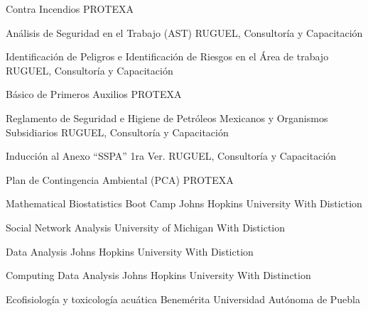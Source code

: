 \documentclass[10pt, letterpaper, roman]{moderncv}
\begin{document}
		{Contra Incendios}
		{\newline PROTEXA}
		{}
		{}
		{}
		
		{Análisis de Seguridad en el Trabajo (AST)}
		{\newline RUGUEL, Consultoría y Capacitación}
		{}
		{}
		{}
		
		{Identificación de Peligros e Identificación de Riesgos en el Área de 
		trabajo}
		{\newline RUGUEL, Consultoría y Capacitación}
		{}
		{}
		{}

		{Básico de Primeros Auxilios}
		{\newline PROTEXA}
		{}
		{}
		{}

		{Reglamento de Seguridad e Higiene de Petróleos Mexicanos y Organismos 
		Subsidiarios}
		{\newline RUGUEL, Consultoría y Capacitación}
		{}
		{}
		{}

		{Inducción al Anexo ``SSPA'' 1ra Ver.}
		{\newline RUGUEL, Consultoría y Capacitación}
		{}
		{}
		{}

		{Plan de Contingencia Ambiental (PCA)}
		{\newline PROTEXA}
		{}
		{}
		{}
		
		{Mathematical Biostatistics Boot Camp}
		{\newline Johns Hopkins University}
		{\newline With Distiction}
		{}
		{}

		{Social Network Analysis}
		{\newline University of Michigan}
		{\newline With Distiction}
		{}
		{}

		{Data Analysis}
		{\newline Johns Hopkins University}
		{\newline With Distiction}
		{}
		{}

		{Computing Data Analysis}
		{\newline Johns Hopkins University}
		{\newline With Distinction}
		{}
		{}

		{Ecofisiología y toxicología acuática}
		{\newline Benemérita Universidad Autónoma de Puebla}
		{}
		{}
		{}
\end{document}

